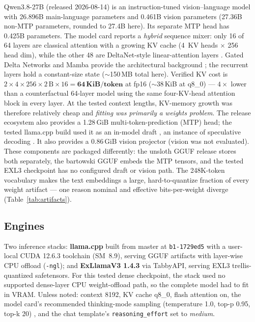 \documentclass[11pt]{article}
\newcommand{\q}[1]{\texttt{#1}}
\begin{document}
Qwen3.8-27B (released 2026-08-14) is an instruction-tuned vision--language
model with 26.896B main-language parameters and 0.461B vision parameters
(27.36B non-MTP parameters, rounded to 27.4B here). Its separate MTP head has
0.425B parameters. The model card reports a
\emph{hybrid} sequence mixer: only 16 of 64 layers are classical attention
with a growing KV cache (4~KV heads $\times$ 256 head dim), while the other 48
are DeltaNet-style linear-attention layers \citep{qwen38model}. Gated Delta
Networks and Mamba provide the architectural background
\citep{yang2024gateddeltanet,gu2023mamba}; the recurrent layers hold a
constant-size state ($\sim$150\,MB total here). Verified KV cost is
$2 \times 4 \times 256 \times 2\,\text{B} \times 16 = \mathbf{64\,KiB/token}$
at fp16 ($\sim$38\,KiB at q8\_0) --- $4\times$ lower than a counterfactual
64-layer model using the same four-KV-head attention block in every layer. At
the tested context lengths, KV-memory growth was therefore
relatively cheap and \emph{fitting was primarily a weights problem}. The
release ecosystem also provides a 1.28\,GiB multi-token-prediction (MTP) head;
the tested llama.cpp build used it as an in-model draft
\citep{qwen38model,gerganov2023llamacpp}, an instance of speculative decoding
\citep{leviathan2022speculative,chen2023speculative}. It also provides a
0.86\,GiB vision
projector (vision was not evaluated). These components are packaged
differently: the unsloth GGUF release stores both separately, the bartowski
GGUF embeds the MTP tensors, and the tested EXL3 checkpoint has no configured
draft or vision path. The 248K-token vocabulary makes the text embeddings a
large, hard-to-quantize fraction of every weight artifact --- one reason
nominal and effective bits-per-weight diverge (Table~\ref{tab:artifacts}).


\subsection{Engines}
\label{sec:engines}

Two inference stacks: \textbf{llama.cpp} \citep{gerganov2023llamacpp} built
from master at \q{b1-1729ed5} with a user-local CUDA 12.6.3 toolchain
(SM~8.9), serving GGUF artifacts with layer-wise CPU offload (\q{-ngl}); and
\textbf{ExLlamaV3 1.4.3} \citep{turboderp2025exllamav3} via TabbyAPI, serving
EXL3 trellis-quantized safetensors. For this tested dense checkpoint, the stack
used no supported dense-layer CPU weight-offload path, so the complete model
had to fit in VRAM. Unless noted:
context 8192, KV cache q8\_0, flash attention on, the model card's recommended
thinking-mode sampling (temperature 1.0, top-p 0.95, top-k 20)
\citep{qwen38model}, and the chat template's
\q{reasoning\_effort} set to \emph{medium}.
\end{document}
